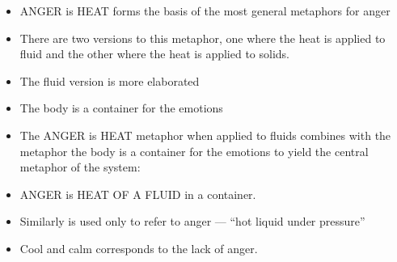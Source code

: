 \documentclass[headrule,footrule]{foils}
\begin{document}

\begin{itemize}
\item ANGER is HEAT forms the basis of the most
  general metaphors for anger
\item There are two versions to this metaphor,
  one where the heat is applied to fluid and
  the other where the heat is applied to
  solids.
\item The fluid version is more elaborated
\end{itemize}

\begin{itemize}
\item The body is a container for the emotions
\begin{exe}
  \ex {}
  \ex {}
  \ex {}
  \ex {}
\end{exe}
\item
The ANGER is HEAT metaphor when applied to fluids combines with the
metaphor the body is a container for the emotions to yield the central
metaphor of the system:
\item ANGER is HEAT OF A FLUID in a container.
\begin{exe}
  \ex {}
  \ex {}
  \ex {}
  \ex {}
  \ex {}
\end{exe}

\item Similarly  is used only to refer to anger --- ``hot liquid under
pressure''
\item Cool and calm corresponds to the lack of anger.
\begin{exe}
  \ex {}
  \ex {}
\end{exe}


\end{itemize}
\end{document}
